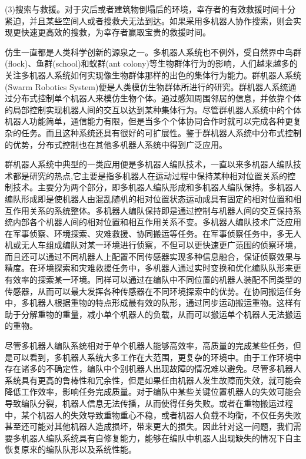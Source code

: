 	(3)搜索与救援。对于灾后或者建筑物倒塌后的环境，幸存者的有效救援时间十分紧迫，并且某些空间人或者搜救犬无法到达。如果采用多机器人协作搜索，则会实现更快速更高效的搜救，为幸存者赢取宝贵的救援时间。
	
仿生一直都是人类科学创新的源泉之一。多机器人系统也不例外，受自然界中鸟群(flock)、鱼群(school)和蚁群(ant colony)等生物群体行为的影响\supercite{stilwell1993toward,theraulaz1991task,reif1999social,balch2000social,couceiro2011novel}，人们越来越多的关注多机器人系统如何实现像生物群体那样的出色的集体行为能力。群机器人系统(Swarm Robotics System)便是人类模仿生物群体所进行的研究\supercite{duarte2016application,duarte2016hybrid,yu2015duration,trianni2015fundamental}。群机器人系统通过分布式控制单个机器人来模仿生物个体。通过感知周围邻居的信息，并依靠个体的局部控制实现机器人间的交互以达到某种集体行为\supercite{viksnin2016flocking,shi2012survey}。尽管群机器人系统中的个体机器人功能简单，通信能力有限，但是当多个个体协同合作时就可以完成各种更复杂的任务。而且这种系统还具有很好的可扩展性。鉴于群机器人系统中分布式控制的优势，分布式控制也在其他多机器人系统中得到广泛应用。
	
群机器人系统中典型的一类应用便是多机器人编队技术，一直以来多机器人编队技术都是研究的热点,它主要是指多机器人在运动过程中保持某种相对位置关系的控制技术\supercite{alonso2016distributed,tang2015research,yang2016behavioral}。主要分为两个部分，即多机器人编队形成和多机器人编队保持。多机器人编队形成即是使机器人由混乱随机的相对位置状态运动成具有固定的相对位置和相互作用关系的系统整体。多机器人编队保持即是通过控制与机器人间的交互保持系统内部各个机器人间的相对位置和相互作用关系不变。多机器人编队技术广泛应用在军事侦察\supercite{柳林2006多机器人系统任务分配及编队控制研究}、环境探索\supercite{renoux2015decision,abed2015multi,benavides2016multi}、灾难救援\supercite{bagosi2016ontological,liu2015multirobot,lee2016information}、协同搬运\supercite{wang2008machine,cheng2016research,fyler2015distributed}等任务。在军事侦察任务中，多无人机或无人车组成编队对某一环境进行侦察，不但可以更快速更广范围的侦察环境，而且还可以通过不同机器人上配置不同传感器实现多种信息融合，保证侦察效果与精度。在环境探索和灾难救援任务中，多机器人通过实时变换和优化编队队形来更有效率的探索某一环境。同样可以通过在编队中不同位置的机器人装配不同类型的传感器，从而可以最大发挥各种传感器在不同环境探索中的优势。在协同搬运任务中，多机器人根据重物的特点形成最有效的队形，通过同步运动搬运重物。这样有助于分解重物的重量，减小单个机器人的负载，从而可以搬运单个机器人无法搬运的重物。

尽管多机器人编队系统相对于单个机器人能够高效率，高质量的完成某些任务，但是可以看到，多机器人系统大多工作在大范围，更复杂的环境中。由于工作环境中存在诸多的不确定性，编队中个别机器人出现故障的情况难以避免。尽管多机器人系统具有更高的鲁棒性和冗余性，但是如果任由机器人发生故障而失效，就可能会降低工作效率，影响任务完成质量。对于编队中某些关键位置机器人的失效可能会导致编队分裂，机器人信息无法传播，从而使得任务失败。或者在重物搬运过程中，某个机器人的失效导致重物重心不稳，或者机器人负载不均衡，不仅任务失败甚至还可能对其他机器人造成损坏，带来更大的损失。因此针对这一问题，我们需要多机器人编队系统具有自修复能力，能够在编队中机器人出现缺失的情况下自主恢复原来的编队队形以及系统性能。

